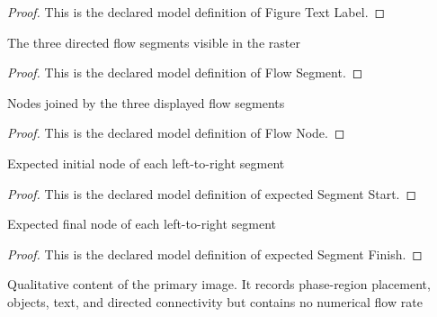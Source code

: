 \begin{proof}
  This is the declared model definition of Figure Text Label.
\end{proof}
\begin{definition}
  \label{def:physics:phyx-mini-0445:phyxminiproblems-problemphyxmini0445-flowsegment}
  The three directed flow segments visible in the raster
\end{definition}
\begin{proof}
  This is the declared model definition of Flow Segment.
\end{proof}
\begin{definition}
  \label{def:physics:phyx-mini-0445:phyxminiproblems-problemphyxmini0445-flownode}
  Nodes joined by the three displayed flow segments
\end{definition}
\begin{proof}
  This is the declared model definition of Flow Node.
\end{proof}
\begin{definition}
  \label{def:physics:phyx-mini-0445:phyxminiproblems-problemphyxmini0445-expectedsegmentstart}
  Expected initial node of each left-to-right segment
\end{definition}
\begin{proof}
  This is the declared model definition of expected Segment Start.
\end{proof}
\begin{definition}
  \label{def:physics:phyx-mini-0445:phyxminiproblems-problemphyxmini0445-expectedsegmentfinish}
  Expected final node of each left-to-right segment
\end{definition}
\begin{proof}
  This is the declared model definition of expected Segment Finish.
\end{proof}
\begin{definition}
  \label{def:physics:phyx-mini-0445:phyxminiproblems-problemphyxmini0445-nitrogenheaterfigure}
  Qualitative content of the primary image. It records phase-region placement, objects, text, and directed connectivity but contains no numerical flow rate
\end{definition}
